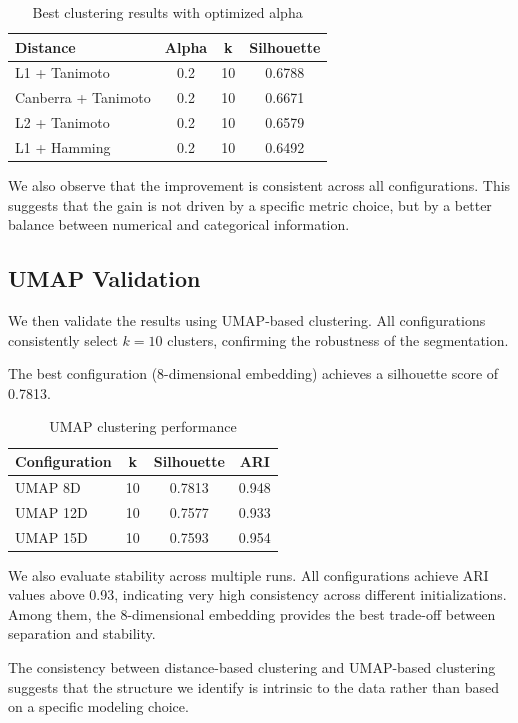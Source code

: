 \documentclass[9pt,a4paper,twocolumn,twoside]{rho-class/rho}
\begin{document}
\begin{table}[H]
\centering
\caption{Best clustering results with optimized alpha}
\begin{tabular}{lccc}
\toprule
Distance & Alpha & k & Silhouette \\
\midrule
L1 + Tanimoto       & 0.2 & 10 & 0.6788 \\
Canberra + Tanimoto & 0.2 & 10 & 0.6671 \\
L2 + Tanimoto       & 0.2 & 10 & 0.6579 \\
L1 + Hamming        & 0.2 & 10 & 0.6492 \\
\bottomrule
\end{tabular}
\end{table}

We also observe that the improvement is consistent across all configurations. This suggests that the gain is not driven by a specific metric choice, but by a better balance between numerical and categorical information.

\subsection{UMAP Validation}

We then validate the results using UMAP-based clustering. All configurations consistently select $k=10$ clusters, confirming the robustness of the segmentation.

The best configuration (8-dimensional embedding) achieves a silhouette score of 0.7813.

\begin{table}[H]
\centering
\caption{UMAP clustering performance}
\begin{tabular}{lccc}
\toprule
Configuration & k & Silhouette & ARI \\
\midrule
UMAP 8D  & 10 & 0.7813 & 0.948 \\
UMAP 12D & 10 & 0.7577 & 0.933 \\
UMAP 15D & 10 & 0.7593 & 0.954 \\
\bottomrule
\end{tabular}
\end{table}

We also evaluate stability across multiple runs. All configurations achieve ARI values above 0.93, indicating very high consistency across different initializations. Among them, the 8-dimensional embedding provides the best trade-off between separation and stability.

The consistency between distance-based clustering and UMAP-based clustering suggests that the structure we identify is intrinsic to the data rather than based on a specific modeling choice.
\end{document}
